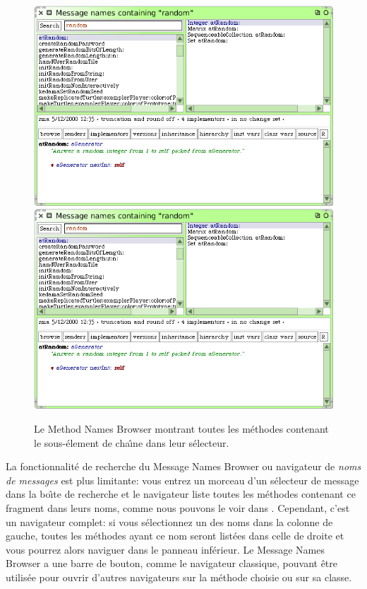 \documentclass[a4paper,10pt,twoside]{book}
\begin{document}
\begin{figure}[btp]
	\begin{center}
	\ifluluelse
		{\includegraphics[width=\textwidth]{methodNamesRandom}}
		{\includegraphics[scale=0.7]{methodNamesRandom}}
	\end{center}
	\caption{Le Method Names Browser montrant toutes les m\'ethodes contenant le sous-\'element de cha\^{\i}ne  dans leur s\'electeur.}
	\label{fig:methodNamesRandom}
\end{figure}


La fonctionnalit\'e de recherche du Message Names Browser ou navigateur de 
\emph{noms de messages} est plus limitante: vous entrez un morceau d'un s\'electeur de 
message dans la bo\^{\i}te de recherche et le navigateur liste toutes les m\'ethodes
contenant ce fragment dans leurs noms, comme nous pouvons le voir dans
.
Cependant, c'est un navigateur complet:
si vous s\'electionnez un des noms dans la colonne de gauche, toutes les m\'ethodes
ayant ce nom seront list\'ees dans celle de droite et vous pourrez alors naviguer dans
le panneau inf\'erieur.
Le Message Names Browser a une barre de bouton, comme le navigateur classique,
pouvant \^etre utilis\'ee pour ouvrir d'autres navigateurs sur la m\'ethode choisie
ou sur sa classe.
\end{document}
